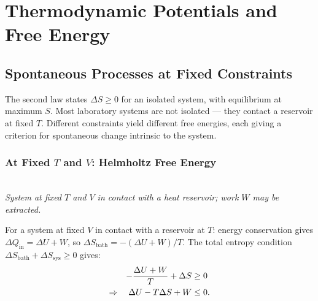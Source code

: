 \chapter{Thermodynamic Potentials and Free Energy}

\section{Spontaneous Processes at Fixed Constraints}

The second law states $\Delta S \geq 0$ for an isolated system, with equilibrium at maximum $S$. Most laboratory systems are not isolated — they contact a reservoir at fixed $T$. Different constraints yield different free energies, each giving a criterion for spontaneous change intrinsic to the system.

\subsection*{At Fixed $T$ and $V$: Helmholtz Free Energy}

\begin{center}
\\[3pt]
{\small\itshape System at fixed $T$ and $V$ in contact with a heat reservoir; work $W$ may be extracted.}
\end{center}

For a system at fixed $V$ in contact with a reservoir at $T$: energy conservation gives $\Delta Q_{\text{in}} = \Delta U + W$, so $\Delta S_{\text{bath}} = -(\Delta U + W)/T$. The total entropy condition $\Delta S_{\text{bath}} + \Delta S_{\text{sys}} \geq 0$ gives:
\begin{align}
    -\frac{\Delta U + W}{T} + \Delta S &\geq 0 \notag \\
    \Rightarrow\quad \Delta U - T\Delta S + W &\leq 0.
\end{align}

